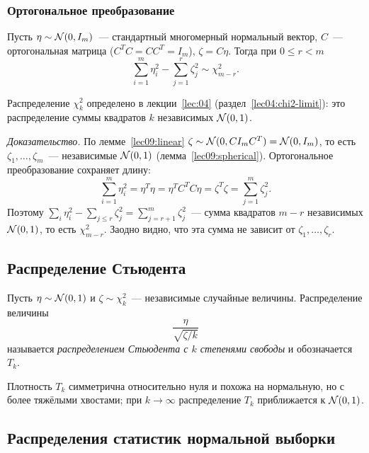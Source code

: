 \subsubsection{Ортогональное преобразование}

\begin{lemma}
  \label{lec09:orthogonal}
  Пусть $\eta \sim \mathcal{N}(0, I_m)$~--- стандартный многомерный нормальный вектор, $C$~---
  ортогональная матрица ($C^T C = C C^T = I_m$), $\zeta = C\eta$. Тогда при $0 \le r < m$
  \[
    \sum_{i=1}^m \eta_i^2 - \sum_{j=1}^r \zeta_j^2 \sim \chi^2_{m-r}.
  \]
\end{lemma}

Распределение $\chi^2_k$ определено в лекции~\ref{lec:04} (раздел~\ref{lec04:chi2-limit}):
это распределение суммы квадратов $k$ независимых $\mathcal{N}(0, 1)$.

\begin{addendum}
  \emph{Доказательство.} По лемме~\ref{lec09:linear}
  $\zeta \sim \mathcal{N}(0, C I_m C^T) = \mathcal{N}(0, I_m)$, то есть $\zeta_1, \ldots, \zeta_m$~---
  независимые $\mathcal{N}(0, 1)$ (лемма~\ref{lec09:spherical}). Ортогональное преобразование
  сохраняет длину:
  \[
    \sum_{i=1}^m \eta_i^2 = \eta^T \eta = \eta^T C^T C \eta = \zeta^T \zeta = \sum_{j=1}^m \zeta_j^2.
  \]
  Поэтому $\sum_i \eta_i^2 - \sum_{j \le r} \zeta_j^2 = \sum_{j = r+1}^m \zeta_j^2$~--- сумма квадратов
  $m - r$ независимых $\mathcal{N}(0, 1)$, то есть $\chi^2_{m-r}$. Заодно видно, что эта сумма
  не зависит от $\zeta_1, \ldots, \zeta_r$.
\end{addendum}


\subsection{Распределение Стьюдента}
\label{lec09:student}

\begin{definition}
  Пусть $\eta \sim \mathcal{N}(0, 1)$ и $\zeta \sim \chi^2_k$~--- независимые случайные величины.
  Распределение величины
  \[
    \frac{\eta}{\sqrt{\zeta / k}}
  \]
  называется \emph{распределением Стьюдента с $k$ степенями свободы} и обозначается $T_k$.
\end{definition}

Плотность $T_k$ симметрична относительно нуля и похожа на нормальную, но с более тяжёлыми
хвостами; при $k \to \infty$ распределение $T_k$ приближается к $\mathcal{N}(0, 1)$.

\subsection{Распределения статистик нормальной выборки}
\label{lec09:theorem}


